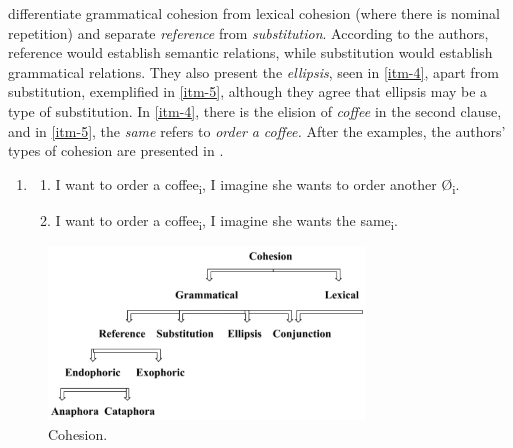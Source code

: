 \documentclass{textolivre}
\begin{document}
\textcite{halliday_cohesion_1976} differentiate grammatical cohesion from
lexical cohesion (where there is nominal repetition) and separate
\emph{reference} from \emph{substitution}. According to the authors,
reference would establish semantic relations, while substitution would
establish grammatical relations. They also present the \emph{ellipsis},
seen in \ref{itm-4}, apart from substitution, exemplified in \ref{itm-5}, although they
agree that ellipsis may be a type of substitution. In \ref{itm-4}, there is the
elision of \emph{coffee} in the second clause, and in \ref{itm-5}, the
\emph{same} refers to \emph{order} \emph{a coffee.} After the examples,
the authors' types of cohesion are presented in .


%
%
\begin{enumerate}[wide,label=(\arabic*),topsep=1ex,partopsep=1ex,noitemsep,leftmargin=0.15cm,resume]
\setlength{\itemindent}{0em}
\item[]{} \addtocounter{enumi}{1}
\begin{enumerate}[wide,label=(\arabic{enumi}\alph*),topsep=1ex,partopsep=1ex,noitemsep]
\setlength{\itemindent}{0em}
\item \label{itm-4} I want to order a coffee\textsubscript{i}, I imagine she wants to order another Ø\textsubscript{i}.
\item \label{itm-5} I want to order a coffee\textsubscript{i}, I imagine she wants the same\textsubscript{i}. 
\end{enumerate}
\end{enumerate}




%
% 
\begin{figure}[htbp]
 \centering
 \includegraphics[width=0.75\textwidth]{fig01.png}
 \caption{Cohesion.}
 \label{fig01}
\end{figure}
\end{document}
